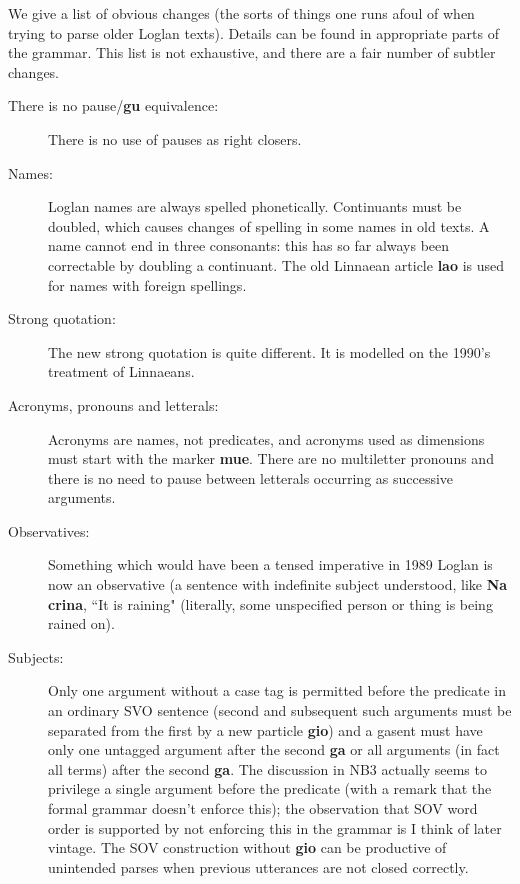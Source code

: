 \documentclass[12pt]{book}
\begin{document}
We give a list of obvious changes (the sorts of things one runs afoul of when trying to parse older Loglan texts).  Details can be found in appropriate parts of the grammar.   This list is not exhaustive, and there are a fair number of subtler changes.

\begin{description}

\item[There is no pause/{\bf gu} equivalence:]  There is no use of pauses as right closers.  


\item[Names:]  Loglan names are always spelled phonetically.  Continuants must be doubled, which causes changes of spelling in some names in old texts.
A name cannot end in three consonants:  this has so far always been correctable by doubling a continuant.  The old Linnaean article {\bf lao} is used for names with foreign spellings.

\item[Strong quotation:]  The new strong quotation is quite different.   It is modelled on the 1990's treatment of Linnaeans.

\item[Acronyms, pronouns and letterals:]   Acronyms are names, not predicates, and acronyms used as dimensions must start with the marker {\bf mue}.  There are no multiletter pronouns and there is no need to pause between letterals occurring as successive arguments.


\item[Observatives:]   Something which would have been a tensed imperative in 1989 Loglan is now an observative (a sentence with indefinite subject understood, like {\bf Na crina}, ``It is raining" (literally, some unspecified person or thing is being rained on).

\item[Subjects:]  Only one argument without a case tag is permitted before the predicate in an ordinary SVO sentence (second and subsequent such arguments must be separated from the first by a new particle {\bf gio}) and a gasent must have only one untagged argument after the second {\bf ga} or all arguments (in fact all terms) after the second {\bf ga}.  The discussion in NB3 actually seems to privilege a single argument before the predicate (with a remark that the formal grammar doesn't enforce this);  the observation that SOV word order is supported by not enforcing this in the grammar is I think of later vintage.  The SOV construction without {\bf gio} can be productive of unintended parses when previous utterances are not closed correctly.


\end{description}
\end{document}
